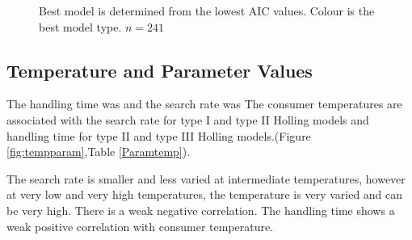 \documentclass{article}
\begin{document}
\begin{figure}[h!]
\caption{Best model is determined from the lowest AIC values.  Colour is the best model type. $n=241$}
\label{fig:tempholandmodel}
\end{figure}

\subsection{Temperature and Parameter Values}
The handling time was and the search rate was
The consumer temperatures are associated with the search rate for type I and type II Holling models and handling time for type II and type III Holling models.(Figure \ref{fig:tempparam},Table \ref{Paramtemp}). %

The search rate is smaller and less varied at intermediate temperatures, however at very low and very high temperatures, the temperature is very varied and can be very high. There is a weak negative correlation. The handling time shows a weak positive correlation with consumer temperature.
\end{document}
